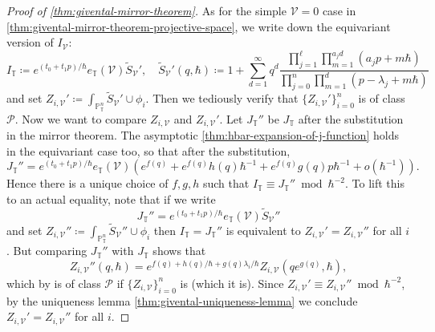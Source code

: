 \documentclass{report}
\theoremstyle{plain}
\theoremstyle{definition}
\theoremstyle{remark}
\newcommand{\bT}{\mathbb{T}}
\newcommand{\bP}{\mathbb{P}}
\newcommand{\cP}{\mathcal{P}}
\newcommand{\cV}{\mathcal{V}}
\begin{document}
\begin{proof}[Proof of \ref{thm:givental-mirror-theorem}]
  As for the simple $\cV = 0$ case in
  \ref{thm:givental-mirror-theorem-projective-space}, we write down
  the equivariant version of $I_{\cV}$:
  \[ I_{\bT} \coloneqq e^{(t_0 + t_1p)/\hbar} e_{\bT}(\cV) \tilde S_{\cV}', \quad \tilde S_{\cV}'(q, \hbar) \coloneqq 1 + \sum_{d=1}^\infty q^d \frac{\prod_{j=1}^\ell \prod_{m=1}^{a_j d} (a_jp + m\hbar)}{\prod_{j=0}^n \prod_{m=1}^d (p - \lambda_j + m\hbar)} \]
  and set $Z_{i,\cV}' \coloneqq \int_{\bP_{\bT}^n} \tilde S_{\cV}'
  \cup \phi_i$. Then we tediously verify that $\{Z_{i,\cV}'\}_{i=0}^n$
  is of class $\cP$. Now we want to compare $Z_{i,\cV}$ and
  $Z_{i,\cV}'$. Let $J_{\bT}''$ be $J_{\bT}$ after the substitution in
  the mirror theorem. The asymptotic
  \ref{thm:hbar-expansion-of-j-function} holds in the equivariant case
  too, so that after the substitution,
  \[ J_{\bT}'' = e^{(t_0 + t_1p)/\hbar} e_{\bT}(\cV)(e^{f(q)} + e^{f(q)}h(q) \hbar^{-1} + e^{f(q)}g(q)p\hbar^{-1} + o(\hbar^{-1})). \]
  Hence there is a unique choice of $f, g, h$ such that $I_{\bT}
  \equiv J_{\bT}'' \bmod{\hbar^{-2}}$. To lift this to an actual
  equality, note that if we write
  \[ J_{\bT}'' = e^{(t_0 + t_1p)/\hbar} e_{\bT}(\cV) \tilde S_{\cV}'' \]
  and set $Z_{i,\cV}'' \coloneqq \int_{\bP_{\bT}^n} \tilde S_{\cV}''
  \cup \phi_i$ then $I_{\bT} = J_{\bT}''$ is equivalent to $Z_{i,\cV}'
  = Z_{i,\cV}''$ for all $i$. But comparing $J_{\bT}''$ with $J_{\bT}$
  shows that
  \[ Z_{i,\cV}''(q, \hbar) = e^{f(q) + h(q)/\hbar + g(q)\lambda_i/\hbar} Z_{i,\cV}(qe^{g(q)}, \hbar), \]
  which by \cite[Lemma 10]{Pandharipande1998} is of class $\cP$ if
  $\{Z_{i,\cV}\}_{i=0}^n$ is (which it is). Since $Z_{i,\cV}' \equiv
  Z_{i,\cV}'' \bmod{\hbar^{-2}}$, by the uniqueness lemma
  \ref{thm:givental-uniqueness-lemma} we conclude $Z_{i,\cV}' =
  Z_{i,\cV}''$ for all $i$.
\end{proof}

\todos



\end{document}
